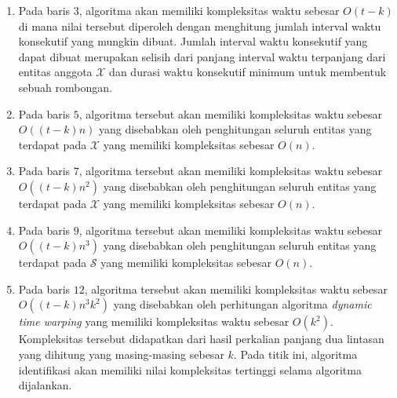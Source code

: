 \begin{enumerate}
    \item Pada baris $3$, algoritma akan memiliki kompleksitas waktu sebesar $O(t - k)$ di mana nilai tersebut diperoleh dengan menghitung jumlah interval waktu konsekutif yang mungkin dibuat. Jumlah interval waktu konsekutif yang dapat dibuat merupakan selisih dari panjang interval waktu terpanjang dari entitas anggota $\mathcal{X}$ dan durasi waktu konsekutif minimum untuk membentuk sebuah rombongan.
    \item Pada baris $5$, algoritma tersebut akan memiliki kompleksitas waktu sebesar $O((t - k)n)$ yang disebabkan oleh penghitungan seluruh entitas yang terdapat pada $\mathcal{X}$ yang memiliki kompleksitas sebesar $O(n)$.
    \item Pada baris $7$, algoritma tersebut akan memiliki kompleksitas waktu sebesar $O((t - k)n^2)$ yang disebabkan oleh penghitungan seluruh entitas yang terdapat pada $\mathcal{X}$ yang memiliki kompleksitas sebesar $O(n)$.
    \item Pada baris $9$, algoritma tersebut akan memiliki kompleksitas waktu sebesar $O((t - k)n^3)$ yang disebabkan oleh penghitungan seluruh entitas yang terdapat pada $\mathcal{S}$ yang memiliki kompleksitas sebesar $O(n)$.
    \item Pada baris $12$, algoritma tersebut akan memiliki kompleksitas waktu sebesar $O((t - k)n^3k^2)$ yang disebabkan oleh perhitungan algoritma \textit{dynamic time warping} yang memiliki kompleksitas waktu sebesar $O(k^2)$. Kompleksitas tersebut didapatkan dari hasil perkalian panjang dua lintasan yang dihitung yang masing-masing sebesar $k$. Pada titik ini, algoritma identifikasi akan memiliki nilai kompleksitas tertinggi selama algoritma dijalankan.
\end{enumerate}
